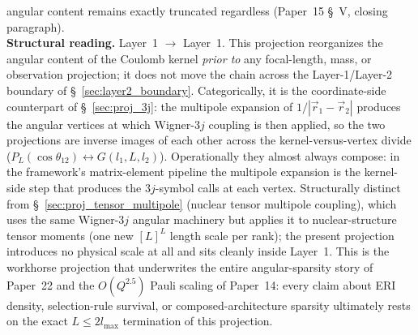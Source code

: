 \documentclass[11pt]{article}
\begin{document}
angular content remains exactly truncated regardless
(Paper~15 \S~V, closing paragraph).\\
\textbf{Structural reading.}  Layer~1 $\to$ Layer~1.  This projection
reorganizes the angular content of the Coulomb kernel \emph{prior to}
any focal-length, mass, or observation projection; it does not move
the chain across the Layer-1/Layer-2 boundary of
\S~\ref{sec:layer2_boundary}.  Categorically, it is the coordinate-side
counterpart of \S~\ref{sec:proj_3j}: the multipole expansion of
$1/|\vec{r}_1 - \vec{r}_2|$ produces the angular vertices at which
Wigner-$3j$ coupling is then applied, so the two projections are
inverse images of each other across the kernel-versus-vertex divide
($P_L(\cos\theta_{12}) \leftrightarrow G(l_1, L, l_2)$).  Operationally
they almost always compose: in the framework's matrix-element pipeline
the multipole expansion is the kernel-side step that produces the
$3j$-symbol calls at each vertex.  Structurally distinct from
\S~\ref{sec:proj_tensor_multipole} (nuclear tensor multipole coupling),
which uses the same Wigner-$3j$ angular machinery but applies it to
nuclear-structure tensor moments (one new $[L]^L$ length scale per
rank); the present projection introduces no physical scale at all and
sits cleanly inside Layer~1.  This is the workhorse projection that
underwrites the entire angular-sparsity story of Paper~22 and the
$O(Q^{2.5})$ Pauli scaling of Paper~14: every claim about ERI density,
selection-rule survival, or composed-architecture sparsity ultimately
rests on the exact $L \leq 2 l_\text{max}$ termination of this
projection.
\end{document}
